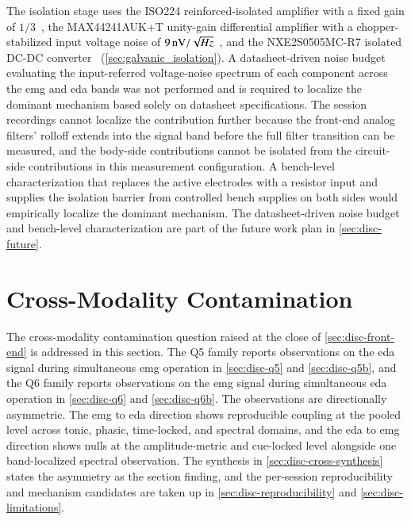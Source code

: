 The isolation stage uses the ISO224 reinforced-isolated amplifier with a fixed gain of \(1/3\)~\cite{noauthor_iso224_nodate}, the MAX44241AUK+T unity-gain differential amplifier with a chopper-stabilized input voltage noise of $\SI{9}{\nano\volt\per\sqrt{\hertz}}$~\cite{noauthor_max44241_nodate}, and the NXE2S0505MC-R7 isolated DC-DC converter~\cite{noauthor_nxe2s0505mcisolated_nodate} (\autoref{sec:galvanic_isolation}). A datasheet-driven noise budget evaluating the input-referred voltage-noise spectrum of each component across the \gls{emg} and \gls{eda} bands was not performed and is required to localize the dominant mechanism based solely on datasheet specifications. The session recordings cannot localize the contribution further because the front-end analog filters' rolloff extends into the signal band before the full filter transition can be measured, and the body-side contributions cannot be isolated from the circuit-side contributions in this measurement configuration. A bench-level characterization that replaces the active electrodes with a resistor input and supplies the isolation barrier from controlled bench supplies on both sides would empirically localize the dominant mechanism. The datasheet-driven noise budget and bench-level characterization are part of the future work plan in \autoref{sec:disc-future}.



\section{Cross-Modality Contamination}
\label{sec:disc-cross-contamination}
The cross-modality contamination question raised at the close of \autoref{sec:disc-front-end} is addressed in this section. The Q5 family reports observations on the \gls{eda} signal during simultaneous \gls{emg} operation in \autoref{sec:disc-q5} and \autoref{sec:disc-q5b}, and the Q6 family reports observations on the \gls{emg} signal during simultaneous \gls{eda} operation in \autoref{sec:disc-q6} and \autoref{sec:disc-q6b}. The observations are directionally asymmetric. The \gls{emg} to \gls{eda} direction shows reproducible coupling at the pooled level across tonic, phasic, time-locked, and spectral domains, and the \gls{eda} to \gls{emg} direction shows nulls at the amplitude-metric and cue-locked level alongside one band-localized spectral observation. The synthesis in \autoref{sec:disc-cross-synthesis} states the asymmetry as the section finding, and the per-session reproducibility and mechanism candidates are taken up in \autoref{sec:disc-reproducibility} and \autoref{sec:disc-limitations}.

